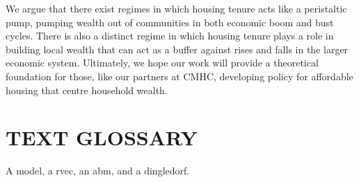 We argue that there exist regimes in which housing tenure acts like a peristaltic pump, pumping wealth out of communities in both economic boom and bust cycles. There is also a distinct regime in which housing tenure plays a role in building local wealth that can act as a buffer against rises and falls in the larger economic system. Ultimately, we hope our work will provide a theoretical foundation for those, like our partners at CMHC, developing policy for affordable housing that centre household wealth. 



\section{TEXT GLOSSARY}

A \gls{model}, a \gls{rvec}, an \gls{abm}, and a \gls{dingledorf}.